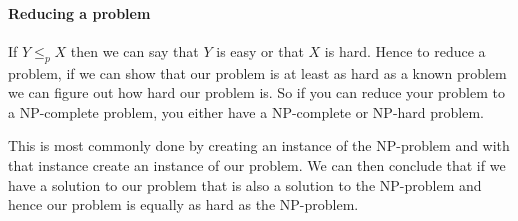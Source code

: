 \documentclass[12pt]{article} %
\begin{document}
\paragraph{Reducing a problem}
If $Y \leq_{p} X$  then we can say that $Y$ is easy or that $X$ is hard. Hence to reduce a problem, if we can show that our problem is at least as hard as a known problem we can figure out how hard our problem is. So if you can reduce your problem to a NP-complete problem, you either have a NP-complete or NP-hard problem.

\par This is most commonly done by creating an instance of the NP-problem and with that instance create an instance of our problem. We can then conclude that if we have a solution to our problem that is also a solution to the NP-problem and hence our problem is equally as hard as the NP-problem.
\end{document}
